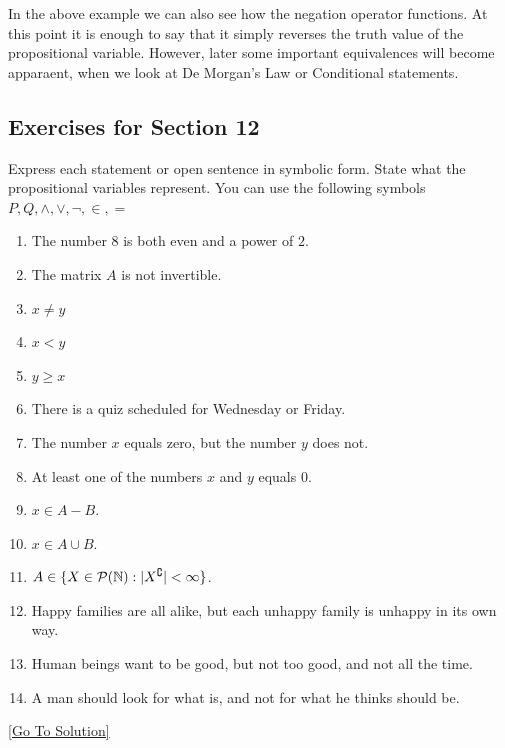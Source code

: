 In the above example we can also see how the negation operator functions. At this point it is enough to say that it simply reverses the truth value of the propositional variable. However, later some important equivalences will become apparaent, when we look at De Morgan's Law or Conditional statements. 

\subsection{Exercises for Section 12}
\begin{exercise}\label{ex:2.12}
    Express each statement or open sentence in symbolic form. State what the propositional variables represent. You can use the following symbols $P,Q,\land, \lor, \neg,\in,=$
    \begin{enumerate}
        \item The number $8$ is both even and a power of $2$. 
        \item The matrix $A$ is not invertible. 
        \item $x\ne y$ 
        \item $x<y$ 
        \item $y\ge x$ 
        \item There is a quiz scheduled for Wednesday or Friday. 
        \item The number $x$ equals zero, but the number $y$ does not. 
        \item At least one of the numbers $x$ and $y$ equals $0$. 
        \item $x\in A-B$.
        \item $x\in A\cup B$.
        \item $A\in \{ X\in\mathcal{P}(\mathbb{N}):\lvert X^{\complement} \rvert < \infty\}$. 
        \item Happy families are all alike, but each unhappy family is unhappy in its own way. 
        \item Human beings want to be good, but not too good, and not all the time. 
        \item A man should look for what is, and not for what he thinks should be. 
    \end{enumerate}
\end{exercise}\hyperref[sol:2.12]{[Go To Solution]}